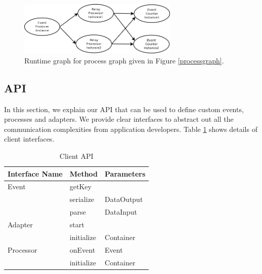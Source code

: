 \begin{figure}[!t]
        \centering
        \includegraphics[width=3.0in]{runtimegraph.png}
        \caption{Runtime graph for process graph given in Figure \ref{processgraph}.}
        \label{runtimegraph}
\end{figure}

\subsection{API}
In this section, we explain our API that can be used to define custom events, processes and adapters. We provide clear interfaces to abstract out all the communication complexities from application developers. Table \ref{api} shows details of client interfaces.




\begin{table}[ht]
	\centering
	\begin{tabular}{| l | l | l |}
        \hline
        Interface Name &  Method & Parameters \\
        \hline
        Event   & getKey &  \\
        \cline{2-3}
        & serialize &  DataOutput \\
	\cline{2-3}        
        & parse &  DataInput \\
        \hline
        Adapter   & start &  \\
        \cline{2-3}
        & initialize &  Container \\
        \hline
        Processor   & onEvent & Event \\
        \cline{2-3}
        & initialize &  Container \\
        \hline
        \end{tabular}
        \caption{Client API}
        \label{api}
\end{table}


